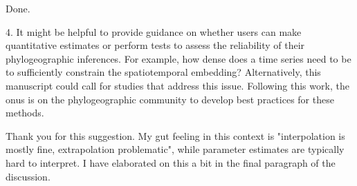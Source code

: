 \documentclass[11pt, oneside]{article}   	%
\newcommand{\response}[1]{{\color{black}{\bf Response:} #1}}
\begin{document}
\response{Done.}


4. It might be helpful to provide guidance on whether users can make quantitative estimates or perform tests to assess the reliability of their phylogeographic inferences. For example, how dense does a time series need to be to sufficiently constrain the spatiotemporal embedding? Alternatively, this manuscript could call for studies that address this issue. Following this work, the onus is on the phylogeographic community to develop best practices for these methods.

\response{Thank you for this suggestion. My gut feeling in this context is "interpolation is mostly fine, extrapolation problematic", while parameter estimates are typically hard to interpret. I have elaborated on this a bit in the final paragraph of the discussion.}
\end{document}
